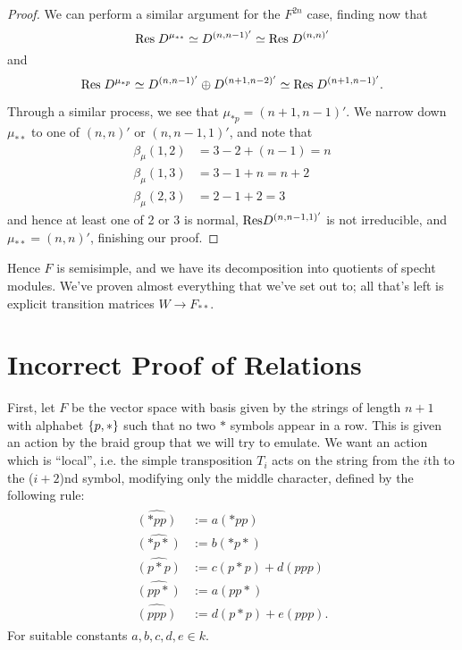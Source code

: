 \documentclass{amsart}
\begin{document}
\begin{proof}
  We can perform a similar argument for the $F^{2n}$ case, finding now that 
  \[\text{Res} \; D^{\mu_{**}} \simeq D^{(n,n-1)'} \simeq \text{Res} \; D^{(n,n)'}\] and 
  \[\text{Res} \; D^{\mu_{*p}} \simeq D^{(n,n-1)'} \oplus D^{(n+1,n-2)'} \simeq \text{Res} \; D^{(n+1,n-1)'}.\]
  
  Through a similar process, we see that $\mu_{*p} = (n+1,n-1)'$.
  We narrow down $\mu_{**}$ to one of $(n,n)'$ or $(n,n-1,1)'$, and note that
  \begin{align*}
    \beta_\mu(1,2) &= 3 - 2 + (n-1) = n\\
    \beta_\mu(1,3) &= 3 - 1 + n = n+2\\
    \beta_\mu(2,3) &= 2 - 1 + 2 = 3
  \end{align*}
  and hence at least one of 2 or 3 is normal, $\text{Res} D^{(n,n-1,1)'}$ is not irreducible, and $\mu_{**} = (n,n)'$, finishing our proof.
\end{proof}
Hence $F$ is semisimple, and we have its decomposition into quotients of specht modules.
We've proven almost everything that we've set out to;
all that's left is explicit transition matrices $W \rightarrow F_{**}$.

\iffalse
\newpage
\section{Incorrect Proof of Relations}

First, let $F$ be the vector space with basis given by the strings of length $n + 1$ with alphabet $\left\{ p,* \right\}$ such that no two $*$ symbols appear in a row.
This is given an action by the braid group that we will try to emulate.
We want an action which is ``local'', i.e. the simple transposition $T_i$ acts on the string from the $i$th to the ($i + 2$)nd symbol, modifying only the middle character, defined by the following rule:
\begin{align}
  \begin{split}
  \widehat{(*pp)} &:= a(*pp)\\
  \widehat{(*p*)} &:= b(*p*)\\
  \widehat{(p*p)} &:= c(p*p) + d(ppp)\\
  \widehat{(pp*)} &:= a(pp*)\\
  \widehat{(ppp)} &:= d(p*p) + e(ppp).
  \end{split}
  \label{Definitions}
 \end{align} 
For suitable constants $a,b,c,d,e \in k$.
\end{document}
